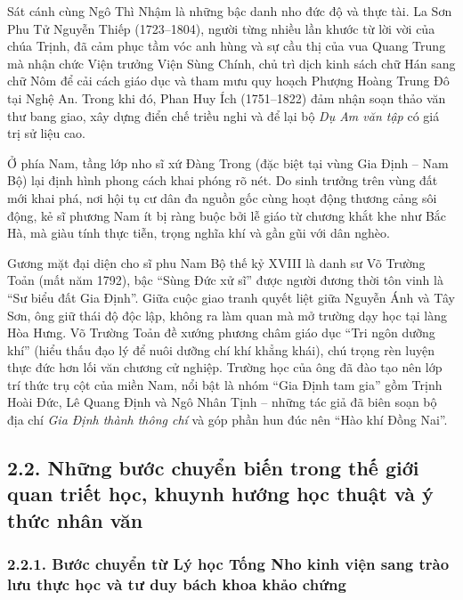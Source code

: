 Sát cánh cùng Ngô Thì Nhậm là những bậc danh nho đức độ và thực tài. La Sơn Phu Tử Nguyễn Thiếp (1723--1804), người từng nhiều lần khước từ lời vời của chúa Trịnh, đã cảm phục tầm vóc anh hùng và sự cầu thị của vua Quang Trung mà nhận chức Viện trưởng Viện Sùng Chính, chủ trì dịch kinh sách chữ Hán sang chữ Nôm để cải cách giáo dục và tham mưu quy hoạch Phượng Hoàng Trung Đô tại Nghệ An. Trong khi đó, Phan Huy Ích (1751--1822) đảm nhận soạn thảo văn thư bang giao, xây dựng điển chế triều nghi và để lại bộ \textit{Dụ Am văn tập} có giá trị sử liệu cao.

Ở phía Nam, tầng lớp nho sĩ xứ Đàng Trong (đặc biệt tại vùng Gia Định -- Nam Bộ) lại định hình phong cách khai phóng rõ nét. Do sinh trưởng trên vùng đất mới khai phá, nơi hội tụ cư dân đa nguồn gốc cùng hoạt động thương cảng sôi động, kẻ sĩ phương Nam ít bị ràng buộc bởi lễ giáo từ chương khắt khe như Bắc Hà, mà giàu tính thực tiễn, trọng nghĩa khí và gần gũi với dân nghèo.

Gương mặt đại diện cho sĩ phu Nam Bộ thế kỷ XVIII là danh sư Võ Trường Toản (mất năm 1792), bậc ``Sùng Đức xử sĩ'' được người đương thời tôn vinh là ``Sư biểu đất Gia Định''. Giữa cuộc giao tranh quyết liệt giữa Nguyễn Ánh và Tây Sơn, ông giữ thái độ độc lập, không ra làm quan mà mở trường dạy học tại làng Hòa Hưng. Võ Trường Toản đề xướng phương châm giáo dục ``Tri ngôn dưỡng khí'' (hiểu thấu đạo lý để nuôi dưỡng chí khí khẳng khái), chú trọng rèn luyện thực đức hơn lối văn chương cử nghiệp. Trường học của ông đã đào tạo nên lớp trí thức trụ cột của miền Nam, nổi bật là nhóm ``Gia Định tam gia'' gồm Trịnh Hoài Đức, Lê Quang Định và Ngô Nhân Tịnh -- những tác giả đã biên soạn bộ địa chí \textit{Gia Định thành thông chí} và góp phần hun đúc nên ``Hào khí Đồng Nai''.

\subsection*{2.2. Những bước chuyển biến trong thế giới quan triết học, khuynh hướng học thuật và ý thức nhân văn}

\subsubsection*{2.2.1. Bước chuyển từ Lý học Tống Nho kinh viện sang trào lưu thực học và tư duy bách khoa khảo chứng}

